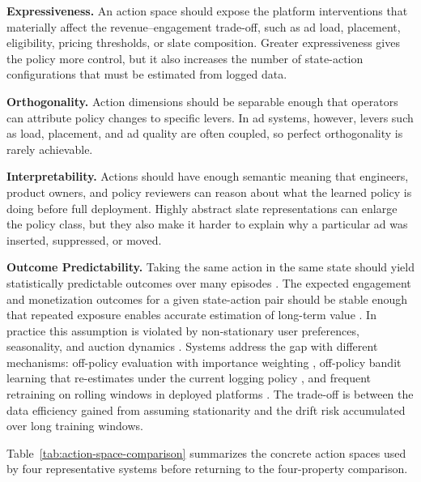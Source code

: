 \documentclass[manuscript,review,screen]{acmart}
\begin{document}
\textbf{Expressiveness.} An action space should expose the platform interventions that materially affect the revenue--engagement trade-off, such as ad load, placement, eligibility, pricing thresholds, or slate composition. Greater expressiveness gives the policy more control, but it also increases the number of state-action configurations that must be estimated from logged data.

\textbf{Orthogonality.} Action dimensions should be separable enough that operators can attribute policy changes to specific levers. In ad systems, however, levers such as load, placement, and ad quality are often coupled, so perfect orthogonality is rarely achievable.

\textbf{Interpretability.} Actions should have enough semantic meaning that engineers, product owners, and policy reviewers can reason about what the learned policy is doing before full deployment. Highly abstract slate representations can enlarge the policy class, but they also make it harder to explain why a particular ad was inserted, suppressed, or moved.

\textbf{Outcome Predictability.} Taking the same action in the same state should yield statistically predictable outcomes over many episodes \cite{puterman2014markov}. The expected engagement and monetization outcomes for a given state-action pair should be stable enough that repeated exposure enables accurate estimation of long-term value \cite{mcmahan2013ad, zhao2018deep}. In practice this assumption is violated by non-stationary user preferences, seasonality, and auction dynamics \cite{dulac2021challenges, hohnhold2015focusing}. Systems address the gap with different mechanisms: off-policy evaluation with importance weighting \cite{swaminathan2015counterfactual}, off-policy bandit learning that re-estimates under the current logging policy \cite{sagtani2024ad}, and frequent retraining on rolling windows in deployed platforms \cite{gauci2018horizon}. The trade-off is between the data efficiency gained from assuming stationarity and the drift risk accumulated over long training windows.

Table~\ref{tab:action-space-comparison} summarizes the concrete action spaces used by four representative systems before returning to the four-property comparison.
\end{document}
